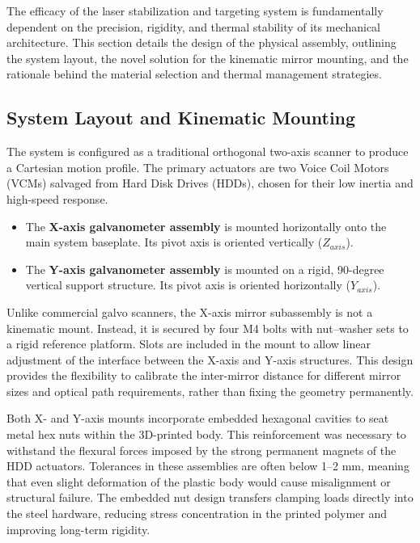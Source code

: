\documentclass[12pt]{article}
\begin{document}
The efficacy of the laser stabilization and targeting system is fundamentally dependent on the precision, rigidity, and thermal stability of its mechanical architecture. This section details the design of the physical assembly, outlining the system layout, the novel solution for the kinematic mirror mounting, and the rationale behind the material selection and thermal management strategies.

\subsection{System Layout and Kinematic Mounting}

The system is configured as a traditional orthogonal two-axis scanner to produce a Cartesian motion profile. The primary actuators are two Voice Coil Motors (VCMs) salvaged from Hard Disk Drives (HDDs), chosen for their low inertia and high-speed response.

\begin{itemize}
\item The \textbf{X-axis galvanometer assembly} is mounted horizontally onto the main system baseplate. Its pivot axis is oriented vertically (\(Z_{axis}\)).
\item The \textbf{Y-axis galvanometer assembly} is mounted on a rigid, 90-degree vertical support structure. Its pivot axis is oriented horizontally (\(Y_{axis}\)).
\end{itemize}

Unlike commercial galvo scanners, the X-axis mirror subassembly is not a kinematic mount. Instead, it is secured by four M4 bolts with nut–washer sets to a rigid reference platform. Slots are included in the mount to allow linear adjustment of the interface between the X-axis and Y-axis structures. This design provides the flexibility to calibrate the inter-mirror distance for different mirror sizes and optical path requirements, rather than fixing the geometry permanently.

Both X- and Y-axis mounts incorporate embedded hexagonal cavities to seat metal hex nuts within the 3D-printed body. This reinforcement was necessary to withstand the flexural forces imposed by the strong permanent magnets of the HDD actuators. Tolerances in these assemblies are often below 1–2 mm, meaning that even slight deformation of the plastic body would cause misalignment or structural failure. The embedded nut design transfers clamping loads directly into the steel hardware, reducing stress concentration in the printed polymer and improving long-term rigidity.
\end{document}

